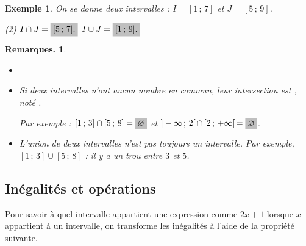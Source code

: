 \documentclass[12pt]{article}
\newtheorem*{exampleil}{Exemple}
\theoremstyle{break}
\newtheorem*{remarks}{Remarques.}
\begin{document}
\begin{exampleil}
  On se donne deux intervalles : $I = [1\,;\,7]$ et $J = [5\,;\,9]$.
  
  \vspace{1em}

\vspace{-1em} 
\begin{tasks}[label=\textbullet](2)
  \task $I \cap J = \hideM{[5\,;\,7].}$
  \task $I \cup J = \hideM{[1\,;\,9].}$
\end{tasks}
\end{exampleil}

\begin{remarks}
  \begin{itemize}[noitemsep]
    \item[]
    \item Si deux intervalles n'ont aucun nombre en commun, leur intersection est , noté \hide{$\varnothing$}.

      Par exemple : $[1\,;\,3] \cap [5\,;\,8] = \hideM{\varnothing}$ et $]-\infty\,;\,2[\, \cap\, [2\,;\,+\infty[\, = \hideM{\varnothing}$.
    \item L'union de deux intervalles n'est pas toujours un intervalle. Par exemple, $[1\,;\,3] \cup [5\,;\,8]$  : il y a un \og trou \fg{} entre $3$ et $5$.
  \end{itemize}
\end{remarks}

\subsection*{Inégalités et opérations}

Pour savoir à quel intervalle appartient une expression comme $2x+1$ lorsque $x$ appartient à un intervalle, on transforme les inégalités à l'aide de la propriété suivante.
\end{document}
